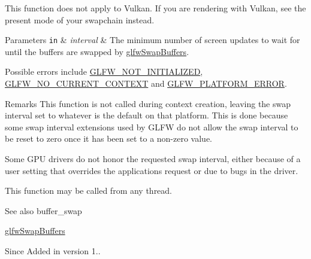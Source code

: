 This function does not apply to Vulkan. If you are rendering with Vulkan, see the present mode of your swapchain instead.


\begin{DoxyParams}[1]{Parameters}
\mbox{\tt in}  & {\em interval} & The minimum number of screen updates to wait for until the buffers are swapped by \hyperlink{group__window_gafb827800eedbfcbc97b1e5408df668d7}{glfw\+Swap\+Buffers}.\\
\hline
\end{DoxyParams}
Possible errors include \hyperlink{group__errors_ga2374ee02c177f12e1fa76ff3ed15e14a}{G\+L\+F\+W\+\_\+\+N\+O\+T\+\_\+\+I\+N\+I\+T\+I\+A\+L\+I\+Z\+ED}, \hyperlink{group__errors_gaa8290386e9528ccb9e42a3a4e16fc0d0}{G\+L\+F\+W\+\_\+\+N\+O\+\_\+\+C\+U\+R\+R\+E\+N\+T\+\_\+\+C\+O\+N\+T\+E\+XT} and \hyperlink{group__errors_gad44162d78100ea5e87cdd38426b8c7a1}{G\+L\+F\+W\+\_\+\+P\+L\+A\+T\+F\+O\+R\+M\+\_\+\+E\+R\+R\+OR}.

\begin{DoxyRemark}{Remarks}
This function is not called during context creation, leaving the swap interval set to whatever is the default on that platform. This is done because some swap interval extensions used by G\+L\+FW do not allow the swap interval to be reset to zero once it has been set to a non-\/zero value.

Some G\+PU drivers do not honor the requested swap interval, either because of a user setting that overrides the application\textquotesingle{}s request or due to bugs in the driver.
\end{DoxyRemark}
This function may be called from any thread.

\begin{DoxySeeAlso}{See also}
buffer\+\_\+swap 

\hyperlink{group__window_gafb827800eedbfcbc97b1e5408df668d7}{glfw\+Swap\+Buffers}
\end{DoxySeeAlso}
\begin{DoxySince}{Since}
Added in version 1.. 
\end{DoxySince}
